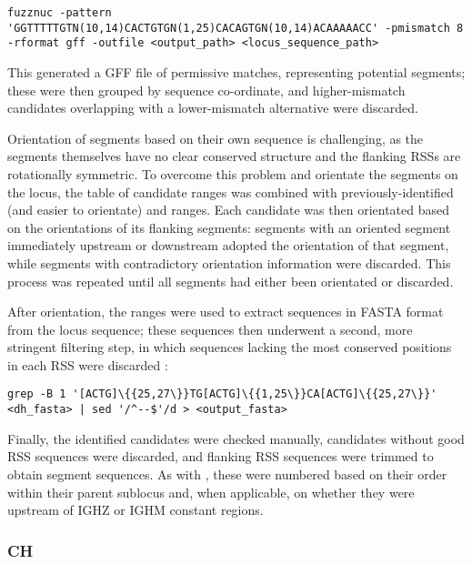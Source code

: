 \begin{lstlisting}
fuzznuc -pattern 'GGTTTTTGTN(10,14)CACTGTGN(1,25)CACAGTGN(10,14)ACAAAAACC' -pmismatch 8 -rformat gff -outfile <output_path> <locus_sequence_path>
\end{lstlisting}

This generated a GFF file \parencite{stein2010generic} of permissive matches, representing potential \dh segments; these were then grouped by sequence co-ordinate, and higher-mismatch candidates overlapping with a lower-mismatch alternative were discarded.

Orientation of \dh segments based on their own sequence is challenging, as the segments themselves have no clear conserved structure and the flanking RSSs are rotationally symmetric. To overcome this problem and orientate the \dh segments on the locus, the table of \dh candidate ranges was combined with previously-identified (and easier to orientate) \vh and \jh ranges. Each \dh candidate was then orientated based on the orientations of its flanking segments: segments with an oriented segment immediately upstream or downstream adopted the orientation of that segment, while segments with contradictory orientation information were discarded. This process was repeated until all \dh segments had either been orientated or discarded.

After orientation, the \dh ranges were used to extract \dh sequences in FASTA format from the locus sequence; these sequences then underwent a second, more stringent filtering step, in which sequences lacking the most conserved positions in each RSS were discarded \parencite{grep}:

\begin{lstlisting}
grep -B 1 '[ACTG]\{{25,27\}}TG[ACTG]\{{1,25\}}CA[ACTG]\{{25,27\}}' <dh_fasta> | sed '/^--$'/d > <output_fasta>
\end{lstlisting}

Finally, the identified \dh candidates were checked manually, candidates without good RSS sequences were discarded, and flanking RSS sequences were trimmed to obtain \dh segment sequences. As with \jh, these were numbered based on their order within their parent sublocus and, when applicable, on whether they were upstream of IGHZ or IGHM constant regions.

\subsubsection{CH}
\label{sec:locus_char_ch}

